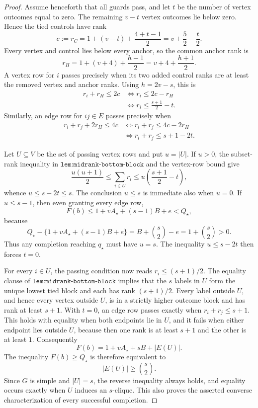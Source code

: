 \documentclass{article}
\begin{document}
\begin{proof}
Assume henceforth that all guards pass, and let \(t\) be the number of vertex outcomes equal to zero.  The remaining \(v-t\) vertex outcomes lie below zero.  Hence the tied controls have rank
\[
 c:=r_C
 =1+(v-t)+\frac{4+t-1}{2}
 =v+\frac52-\frac t2.
\]
Every vertex and control lies below every anchor, so the common anchor rank is
\[
 r_H
 =1+(v+4)+\frac{h-1}{2}
 =v+4+\frac{h+1}{2}.
\]
A vertex row for \(i\) passes precisely when its two added control ranks are at least the removed vertex and anchor ranks.  Using \(h=2v-s\), this is
\[
\begin{aligned}
 r_i+r_H\le2c
 &\Longleftrightarrow
 r_i\le 2c-r_H\\
 &\Longleftrightarrow
 r_i\le\frac{s+1}{2}-t.
\end{aligned}
\]
Similarly, an edge row for \(ij\in E\) passes precisely when
\[
\begin{aligned}
 r_i+r_j+2r_H\le4c
 &\Longleftrightarrow
 r_i+r_j\le4c-2r_H\\
 &\Longleftrightarrow
 r_i+r_j\le s+1-2t.
\end{aligned}
\]

Let \(U\subseteq V\) be the set of passing vertex rows and put \(u=|U|\).  If \(u>0\), the subset-rank inequality in \(\texttt{lem:midrank-bottom-block}\) and the vertex-row bound give
\[
 \frac{u(u+1)}2
 \le\sum_{i\in U}r_i
 \le u\left(\frac{s+1}{2}-t\right),
\]
whence \(u\le s-2t\le s\).  The conclusion \(u\le s\) is immediate also when \(u=0\).  If \(u\le s-1\), then even granting every edge row,
\[
 F(b)\le1+vA_\star+(s-1)B+e<Q_\star,
\]
because
\[
 Q_\star-\{1+vA_\star+(s-1)B+e\}
 =B+\binom{s}{2}-e
 =1+\binom{s}{2}>0.
\]
Thus any completion reaching \(q_\star\) must have \(u=s\).  The inequality \(u\le s-2t\) then forces \(t=0\).

For every \(i\in U\), the passing condition now reads \(r_i\le(s+1)/2\).  The equality clause of \(\texttt{lem:midrank-bottom-block}\) implies that the \(s\) labels in \(U\) form the unique lowest tied block and each has rank \((s+1)/2\).  Every label outside \(U\), and hence every vertex outside \(U\), is in a strictly higher outcome block and has rank at least \(s+1\).  With \(t=0\), an edge row passes exactly when \(r_i+r_j\le s+1\).  This holds with equality when both endpoints lie in \(U\), and it fails when either endpoint lies outside \(U\), because then one rank is at least \(s+1\) and the other is at least \(1\).  Consequently
\[
 F(b)=1+vA_\star+sB+|E(U)|.
\]
The inequality \(F(b)\ge Q_\star\) is therefore equivalent to
\[
 |E(U)|\ge\binom{s}{2}.
\]
Since \(G\) is simple and \(|U|=s\), the reverse inequality always holds, and equality occurs exactly when \(U\) induces an \(s\)-clique.  This also proves the asserted converse characterization of every successful completion.


\end{proof}
\end{document}
